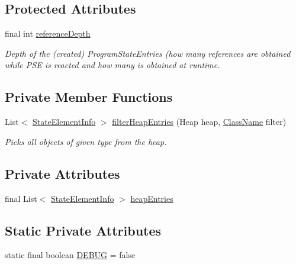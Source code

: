 \subsection*{Protected Attributes}
\begin{DoxyCompactItemize}
\item 
final int \hyperlink{classgov_1_1nasa_1_1jpf_1_1inspector_1_1server_1_1programstate_1_1_state_node_a55683618625dae46e8aa68d95811d6bb}{reference\+Depth}
\begin{DoxyCompactList}\small\item\em Depth of the (created) Program\+State\+Entries (how many references are obtained while P\+SE is reacted and how many is obtained at runtime. \end{DoxyCompactList}\end{DoxyCompactItemize}
\subsection*{Private Member Functions}
\begin{DoxyCompactItemize}
\item 
List$<$ \hyperlink{classgov_1_1nasa_1_1jpf_1_1inspector_1_1server_1_1programstate_1_1_state_element_info}{State\+Element\+Info} $>$ \hyperlink{classgov_1_1nasa_1_1jpf_1_1inspector_1_1server_1_1programstate_1_1_state_heap_entry_list_ada8d1027f54479d763b9b3b4690b68ef}{filter\+Heap\+Entries} (Heap heap, \hyperlink{classgov_1_1nasa_1_1jpf_1_1inspector_1_1utils_1_1expressions_1_1_class_name}{Class\+Name} filter)
\begin{DoxyCompactList}\small\item\em Picks all objects of given type from the heap. \end{DoxyCompactList}\end{DoxyCompactItemize}
\subsection*{Private Attributes}
\begin{DoxyCompactItemize}
\item 
final List$<$ \hyperlink{classgov_1_1nasa_1_1jpf_1_1inspector_1_1server_1_1programstate_1_1_state_element_info}{State\+Element\+Info} $>$ \hyperlink{classgov_1_1nasa_1_1jpf_1_1inspector_1_1server_1_1programstate_1_1_state_heap_entry_list_aa3db81744d71bbff39d4af64b1f30a1a}{heap\+Entries}
\end{DoxyCompactItemize}
\subsection*{Static Private Attributes}
\begin{DoxyCompactItemize}
\item 
static final boolean \hyperlink{classgov_1_1nasa_1_1jpf_1_1inspector_1_1server_1_1programstate_1_1_state_heap_entry_list_a3880b67f48282ea20d19ffa19491ec35}{D\+E\+B\+UG} = false
\end{DoxyCompactItemize}


